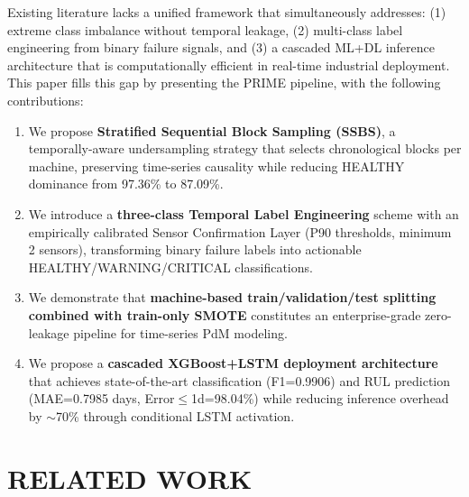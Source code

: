 \documentclass[conference]{IEEEtran}
\begin{document}
Existing literature lacks a unified framework that simultaneously addresses: (1) extreme class imbalance without temporal leakage, (2) multi-class label engineering from binary failure signals, and (3) a cascaded ML+DL inference architecture that is computationally efficient in real-time industrial deployment. This paper fills this gap by presenting the PRIME pipeline, with the following contributions:

\begin{enumerate}
\item We propose \textbf{Stratified Sequential Block Sampling (SSBS)}, a temporally-aware undersampling strategy that selects chronological blocks per machine, preserving time-series causality while reducing HEALTHY dominance from 97.36\% to 87.09\%.
\item We introduce a \textbf{three-class Temporal Label Engineering} scheme with an empirically calibrated Sensor Confirmation Layer (P90 thresholds, minimum 2 sensors), transforming binary failure labels into actionable HEALTHY/WARNING/CRITICAL classifications.
\item We demonstrate that \textbf{machine-based train/validation/test splitting combined with train-only SMOTE} constitutes an enterprise-grade zero-leakage pipeline for time-series PdM modeling.
\item We propose a \textbf{cascaded XGBoost+LSTM deployment architecture} that achieves state-of-the-art classification (F1=0.9906) and RUL prediction (MAE=0.7985 days, Error$\leq$1d=98.04\%) while reducing inference overhead by $\sim$70\% through conditional LSTM activation.
\end{enumerate}

\section{RELATED WORK}
\end{document}
